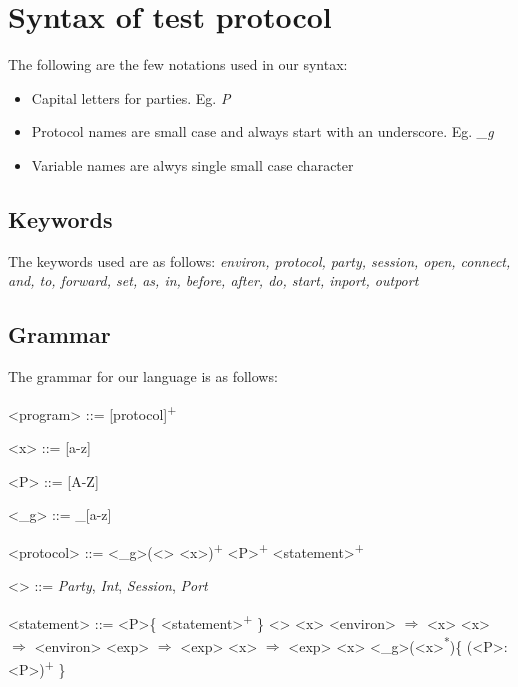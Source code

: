 
\section{Syntax of test protocol}
\label{sec:syntax-test}

The following are the few notations used in our syntax:

\begin{itemize}                 
    \item Capital letters for parties. Eg. \textit{P} 
    \item Protocol names are small case and always start with an underscore. Eg. \textit{_g}
    \item Variable names are alwys single small case character
\end{itemize}

\subsection{Keywords}
The keywords used are as follows:
\textit{environ, protocol, party, session, open, connect, and, to, forward, set, as, in,
before, after, do, start, inport, outport}

\subsection{Grammar}
The grammar for our language is as follows:

\begin{grammar}
    <program> ::= [protocol]\textsuperscript{+}

    <x> ::= [a-z] 

    <P> ::= [A-Z]

    <_g> ::= _[a-z]

    <protocol> ::= <_g>\lit{(}(<\texttau > <x>)\textsuperscript{+}\lit{)} <P>\textsuperscript{+} \lit{\{} <statement>\textsuperscript{+} \lit{\}}

    <\texttau > ::= \textit{Party}, \textit{Int}, \textit{Session}, \textit{Port}

    <statement> ::=  <P>\{ <statement>\textsuperscript{+} \} \alt
    <\texttau > <x> \alt
    <environ> $\Rightarrow$ <x> \alt
    <x> $\Rightarrow$ <environ> \alt
    <exp> $\Rightarrow$ <exp> 
    <x> $\Rightarrow$ <exp> \alt
     <x>  <_g>(<x>\textsuperscript{*})\{ (<P>:<P>)\textsuperscript{+} \}

\end{grammar}
